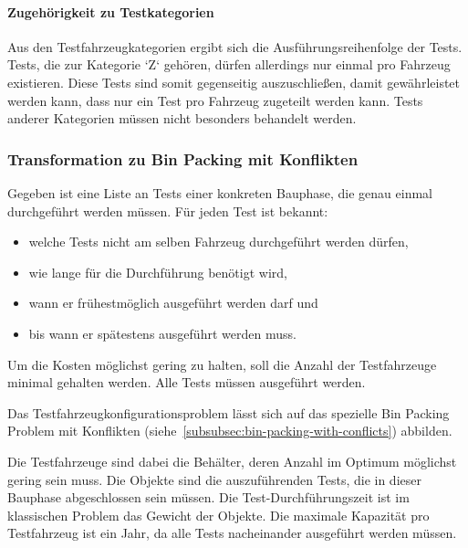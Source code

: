 \paragraph{Zugehörigkeit zu Testkategorien}

Aus den Testfahrzeugkategorien ergibt sich die Ausführungsreihenfolge der Tests.
Tests, die zur Kategorie `Z` gehören, dürfen allerdings nur einmal pro Fahrzeug existieren.
Diese Tests sind somit gegenseitig auszuschließen, damit gewährleistet werden kann,
dass nur ein Test pro Fahrzeug zugeteilt werden kann.
Tests anderer Kategorien müssen nicht besonders behandelt werden.

\subsubsection{Transformation zu Bin Packing mit Konflikten}

Gegeben ist eine Liste an Tests einer konkreten Bauphase, die genau einmal durchgeführt werden müssen.
Für jeden Test ist bekannt:
\begin{itemize}
    \item welche Tests nicht am selben Fahrzeug durchgeführt werden dürfen,
    \item wie lange für die Durchführung benötigt wird,
    \item wann er frühestmöglich ausgeführt werden darf und
    \item bis wann er spätestens ausgeführt werden muss.
\end{itemize}

Um die Kosten möglichst gering zu halten, soll die Anzahl der Testfahrzeuge minimal gehalten werden.
Alle Tests müssen ausgeführt werden.

Das Testfahrzeugkonfigurationsproblem lässt sich auf das spezielle Bin Packing Problem mit Konflikten
(siehe~\cref{subsubsec:bin-packing-with-conflicts}) abbilden.

Die Testfahrzeuge sind dabei die Behälter, deren Anzahl im Optimum möglichst gering sein muss.
Die Objekte sind die auszuführenden Tests, die in dieser Bauphase abgeschlossen sein müssen.
Die Test-Durchführungszeit ist im klassischen Problem das Gewicht der Objekte.
Die maximale Kapazität pro Testfahrzeug ist ein Jahr, da alle Tests nacheinander ausgeführt werden müssen.

